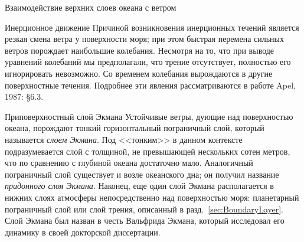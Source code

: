 \begin{chapter}{Взаимодействие верхних слоев океана с ветром}
\begin{section}{Инерционное движение}
Причиной возникновения инерционных течений является резкая смена ветра
у поверхности моря; при этом быстрая перемена сильных ветров порождает
наибольшие колебания. Несмотря на то, что при выводе уравнений колебаний мы
предполагали, что трение отсутствует, полностью его игнорировать невозможно.
Со временем колебания вырождаются в другие поверхностные течения. 
Подробнее эти явления рассматриваются в работе Apel, 1987: \S6.3.
%
\end{section}

\begin{section}{Приповерхностный слой Экмана}
Устойчивые ветры, дующие над поверхностью 
океана,  порождают тонкий горизонтальный
пограничный слой, который называется \textit{слоем Экмана}. 
 Под <<тонким>> в данном контексте
подразумевается слой с толщиной, не превышающей нескольких сотен метров, 
что по сравнению с глубиной океана достаточно мало. Аналогичный пограничный
слой существует и возле океанского дна; он получил название 
\emph{придонного слоя Экмана}.
Наконец, еще один слой Экмана располагается в нижних слоях атмосферы 
непосредственно над поверхностью моря: планетарный пограничный слой
или слой трения, описанный в разд.~\ref{sec:BoundaryLayer}. Слой Экмана 
был назван в честь Вальфрида Экмана, который исследовал его 
динамику в своей докторской диссертации.
%


\end{section}
\end{chapter}
